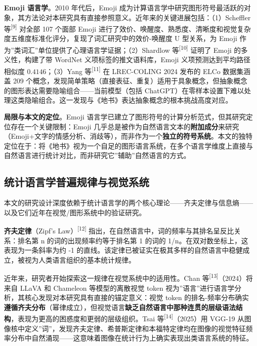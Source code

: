 \documentclass[12pt,a4paper,UTF8,fontset=founder]{ctexart}
\begin{document}
\textbf{Emoji 语言学}。2010 年代后，Emoji 成为计算语言学中研究图形符号最活跃的对象，其方法论对本研究具有直接参照意义。近年来的关键进展包括：（1）Scheffler 等\textsuperscript{{[}9{]}} 对全部 107 个面部 Emoji 进行了效价、唤醒度、熟悉度、清晰度和视觉复杂度五维度标准化评分，复现了词汇研究中的效价-唤醒度 U 型关系，为 Emoji 作为''类词汇''单位提供了心理语言学证据；（2）Shardlow 等\textsuperscript{{[}10{]}} 证明了 Emoji 的多义性，构建了带 WordNet 义项标签的推文语料库，Emoji 义项预测达到平均路径相似度 $0.4146$；（3）Yang 等\textsuperscript{{[}11{]}} 在 LREC-COLING 2024 发布的 ELCo 数据集涵盖 209 个概念，发现简单策略（直接表征、重复）适用于具象概念，但抽象概念的图形表达需要隐喻组合------当前模型（包括 ChatGPT）在零样本设置下难以处理这类隐喻组合。这一发现与《地书》表达抽象概念的根本挑战高度对应。

\textbf{局限与本文的定位}。Emoji 语言学已建立了图形符号的计算分析范式，但其研究定位存在一个关键限制：Emoji 几乎总是被作为自然语言文本的\textbf{附加成分}来研究（Emoji+文字的情感分析、消歧等），而非作为一个\textbf{独立的符号系统}。本文的独特定位在于：将《地书》视为一个自足的图形语言系统，在多个语言学维度上直接与自然语言进行统计对比，而非研究它''辅助''自然语言的方式。

\subsection{统计语言学普遍规律与视觉系统}\label{ux7edfux8ba1ux8bedux8a00ux5b66ux666eux904dux89c4ux5f8bux4e0eux89c6ux89c9ux7cfbux7edf}

本文的研究设计深度依赖于统计语言学的两个核心理论------齐夫定律与信息熵------以及它们近年在视觉/图形系统中的验证研究。

\textbf{齐夫定律}（Zipf's Law）\textsuperscript{{[}12{]}} 指出，在自然语言中，词的频率与其排名呈反比关系：排名第 n 的词的出现频率约等于排名第 1 的词的 1/n。在双对数坐标上，这表现为一条斜率为约 -1 的直线。该定律已被证实在极其多样的自然语言中稳健成立，被视为人类语言组织的基本统计规律。

近年来，研究者开始探索这一规律在视觉系统中的适用性。Chan 等\textsuperscript{{[}13{]}}（2024）将来自 LLaVA 和 Chameleon 等模型的离散视觉 token 视为''语言''进行语言学分析，其核心发现对本研究具有直接的锚定意义：视觉 token 的排名-频率分布确实\textbf{遵循齐夫分布}（幂律成立），但视觉语言\textbf{缺乏自然语言中那种连贯的层级语法结构}，表现为更高的困惑度和更弱的层级组织。Tsai 等\textsuperscript{{[}14{]}}（2025）用 VGG-19 从图像核中定义''词''，发现齐夫定律、希普斯定律和本福特定律均在图像的视觉特征频率分布中自然涌现------这意味着图像在统计行为上确实表现出类语言系统的特征。
\end{document}
